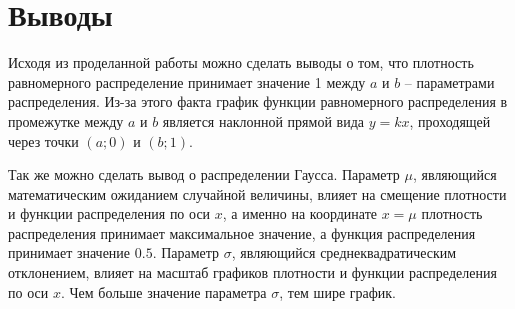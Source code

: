 \section{Выводы}

Исходя из проделанной работы можно сделать выводы о том, что плотность равномерного распределение принимает значение 1 между $a$ и $b$ -- параметрами распределения. Из-за этого факта график функции равномерного распределения в промежутке между $a$ и $b$ является наклонной прямой вида $y = kx$, проходящей через точки $(a; 0)$ и $(b; 1)$.

Так же можно сделать вывод о распределении Гаусса. Параметр $\mu$, являющийся математическим ожиданием случайной величины, влияет на смещение плотности и функции распределения по оси $x$, а именно на координате $x = \mu$ плотность распределения принимает максимальное значение, а функция распределения принимает значение $0.5$. Параметр $\sigma$, являющийся среднеквадратическим отклонением, влияет на масштаб графиков плотности и функции распределения по оси $x$. Чем больше значение параметра $\sigma$, тем шире график.
